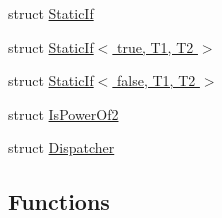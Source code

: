 \begin{DoxyCompactItemize}
struct \hyperlink{structcv_1_1gpu_1_1device_1_1reduce__key__val__detail_1_1StaticIf}{Static\-If}
\item 
struct \hyperlink{structcv_1_1gpu_1_1device_1_1reduce__key__val__detail_1_1StaticIf_3_01true_00_01T1_00_01T2_01_4}{Static\-If$<$ true, T1, T2 $>$}
\item 
struct \hyperlink{structcv_1_1gpu_1_1device_1_1reduce__key__val__detail_1_1StaticIf_3_01false_00_01T1_00_01T2_01_4}{Static\-If$<$ false, T1, T2 $>$}
\item 
struct \hyperlink{structcv_1_1gpu_1_1device_1_1reduce__key__val__detail_1_1IsPowerOf2}{Is\-Power\-Of2}
\item 
struct \hyperlink{structcv_1_1gpu_1_1device_1_1reduce__key__val__detail_1_1Dispatcher}{Dispatcher}
\end{DoxyCompactItemize}
\subsection*{Functions}
